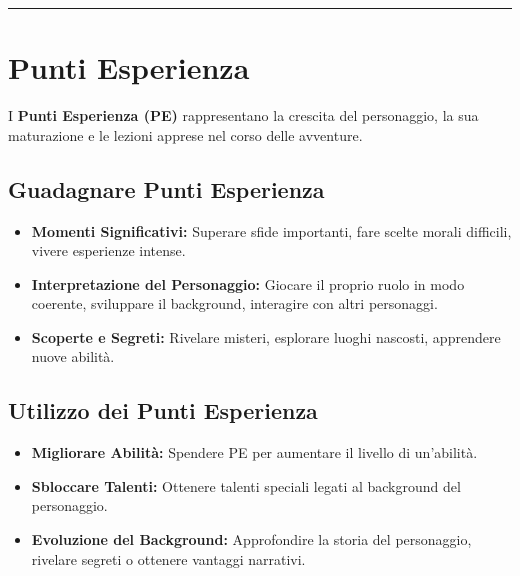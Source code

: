 \documentclass[../manuale_main.tex]{subfiles}
\begin{document}
\vspace{0.5cm}
\noindent
\begin{center}
\rule{\textwidth}{0.4pt} 
\end{center}
\vspace{0.5cm}

\section{Punti Esperienza}
I \textbf{Punti Esperienza (PE)} rappresentano la crescita del personaggio, la sua maturazione e le lezioni apprese nel corso delle avventure.

\subsection{Guadagnare Punti Esperienza}
\begin{itemize}
    \item \textbf{Momenti Significativi:} Superare sfide importanti, fare scelte morali difficili, vivere esperienze intense.
    \item \textbf{Interpretazione del Personaggio:} Giocare il proprio ruolo in modo coerente, sviluppare il background, interagire con altri personaggi.
    \item \textbf{Scoperte e Segreti:} Rivelare misteri, esplorare luoghi nascosti, apprendere nuove abilità.
\end{itemize}

\subsection{Utilizzo dei Punti Esperienza}
\begin{itemize}
    \item \textbf{Migliorare Abilità:} Spendere PE per aumentare il livello di un'abilità.
    \item \textbf{Sbloccare Talenti:} Ottenere talenti speciali legati al background del personaggio.
    \item \textbf{Evoluzione del Background:} Approfondire la storia del personaggio, rivelare segreti o ottenere vantaggi narrativi.
\end{itemize}
\end{document}
